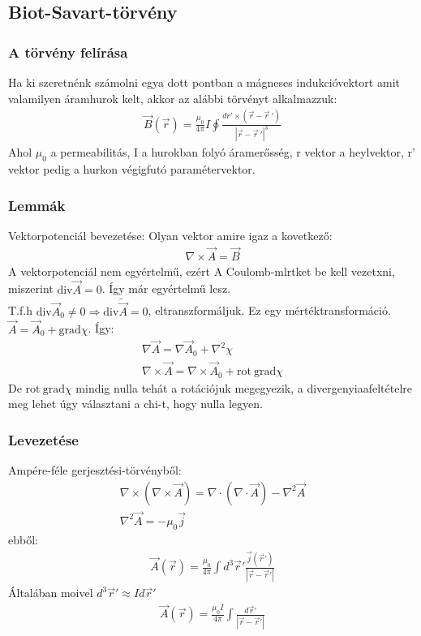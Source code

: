\documentclass{article}
\begin{document}
\subsection{Biot-Savart-törvény}
\subsubsection{A törvény felírása}
Ha ki szeretnénk számolni egya dott pontban a mágneses indukcióvektort amit valamilyen áramhurok kelt, akkor az alábbi törvényt alkalmazzuk:
\begin{gather*}
\vec{B}(\vec{r}) = \frac{\mu_0}{4\pi}I \oint \frac{dr' \times (\vec{r}-\vec{r} \ ')}{|\vec{r}-\vec{r} \ '|^3}
\end{gather*}
Ahol $\mu_0$ a permeabilitás, I a hurokban folyó áramerősség, r vektor a heylvektor, r' vektor pedig a hurkon végigfutó paramétervektor.

\subsubsection{Lemmák}
Vektorpotenciál bevezetése: Olyan vektor amire igaz a kovetkező:
\begin{gather*}
\nabla \times \vec{A} = \vec{B}
\end{gather*}
A vektorpotenciál nem egyértelmű, ezért A Coulomb-mlrtket be kell vezetxni, miszerint $\mathrm{div}\vec{A} = 0$. Így már egyértelmű lesz. \\
T.f.h $\mathrm{div} \vec{A}_0 \neq 0 \Rightarrow \mathrm{div} \tilde{\vec{A}} = 0$, eltranszformáljuk. Ez egy mértéktransformáció. $\vec{A} = \vec{A}_0 + \mathrm{grad} \chi$. Így:
\begin{gather*}
\nabla \vec{A} = \nabla \vec{A}_0 + \nabla^2 \chi \\
\nabla \times \vec{A} = \nabla \times \vec {A}_0 + \mathrm{rot \ grad} \chi
\end{gather*}
De $\mathrm{rot \ grad} \chi$ mindig nulla tehát a rotációjuk megegyezik, a divergenyiaafeltételre meg lehet úgy választani a chi-t, hogy nulla legyen.

\subsubsection{Levezetése}
Ampére-féle gerjesztési-törvényből:
\begin{gather*}
\nabla \times (\nabla \times \vec{A}) = \nabla \cdot (\nabla \cdot \vec{A}) - \nabla^2 \vec{A} \\
\nabla^2 \vec{A} = -\mu_0 \vec{j}
\end{gather*}
ebből:
\begin{gather*}
\vec{A}(\vec{r}) = \frac{\mu_0}{4\pi}\int d^3\vec{r}' \frac{\vec{j}(\vec{r}')}{|\vec{r}-\vec{r}'|}
\end{gather*}
Általában moivel $d^3\vec{r}' \approx I d\vec{r}'$
\begin{gather*}
\vec{A}(\vec{r}) = \frac{\mu_0I}{4\pi}\int  \frac{d\vec{r}'}{|\vec{r}-\vec{r}'|}
\end{gather*}
\end{document}
